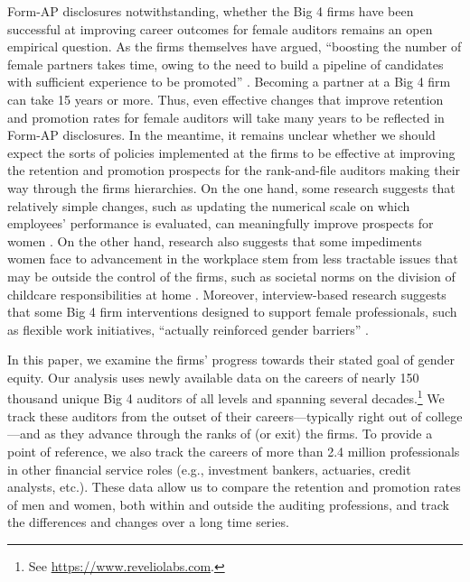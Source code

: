 \documentclass[11pt]{article}
\begin{document}
    Form-AP disclosures notwithstanding, whether the Big 4 firms have been successful at improving career outcomes for female auditors remains an open empirical question. As the firms themselves have argued, ``boosting the number of female partners takes time, owing to the need to build a pipeline of candidates with sufficient experience to be promoted'' \parencite{kissinBigFourAccounting2025}. Becoming a partner at a Big 4 firm can take 15 years or more. Thus, even effective changes that improve retention and promotion rates for female auditors will take many years to be reflected in Form-AP disclosures. In the meantime, it remains unclear whether we should expect the sorts of policies implemented at the firms to be effective at improving the retention and promotion prospects for the rank-and-file auditors making their way through the firms hierarchies. On the one hand, some research suggests that relatively simple changes, such as updating the numerical scale on which employees' performance is evaluated, can meaningfully improve prospects for women \parencite{riveraScalingInequalityRating2019}. On the other hand, research also suggests that some impediments women face to advancement in the workplace stem from less tractable issues that may be outside the control of the firms, such as societal norms on the division of childcare responsibilities at home \parencite{duLockedinHomeGender2023}. Moreover, interview-based research suggests that some Big 4 firm interventions designed to support female professionals, such as flexible work initiatives, ``actually reinforced gender barriers'' \parencite{kornbergerChangingGenderDomination2010}.
    
    In this paper, we examine the firms’ progress towards their stated goal of gender equity. Our analysis uses newly available data on the careers of nearly 150 thousand unique Big 4 auditors of all levels and spanning several decades.\footnote{See \url{https://www.reveliolabs.com}.} We track these auditors from the outset of their careers—typically right out of college—and as they advance through the ranks of (or exit) the firms. To provide a point of reference, we also track the careers of more than 2.4 million professionals in other financial service roles (e.g., investment bankers, actuaries, credit analysts, etc.). These data allow us to compare the retention and promotion rates of men and women, both within and outside the auditing professions, and track the differences and changes over a long time series.
           
\end{document}
